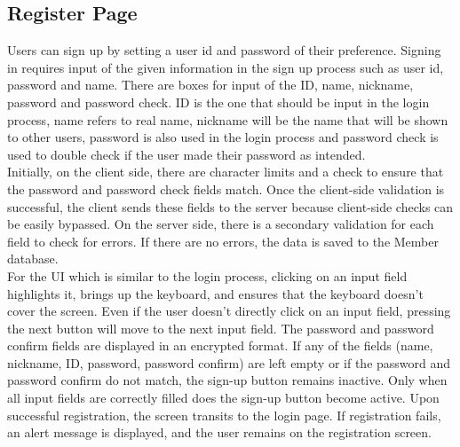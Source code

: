 \documentclass[conference]{IEEEtran}
\begin{document}
    \subsection{Register Page}
        Users can sign up by setting a user id and password of their preference. Signing in requires input  of the given information in the sign up process such as user id, password and name. There are boxes for input of the ID, name, nickname, password and password check. ID is the one that should be input in the login process, name refers to real name, nickname will be the name that will be shown to other users, password is also used in the login process and password check is used to double check if the user made their password as intended.\\
        Initially, on the client side, there are character limits and a check to ensure that the password and password check fields match. Once the client-side validation is successful, the client sends these fields to the server because client-side checks can be easily bypassed. On the server side, there is a secondary validation for each field to check for errors. If there are no errors, the data is saved to the Member database.  \\
        For the UI which is similar to the login process, clicking on an input field highlights it, brings up the keyboard, and ensures that the keyboard doesn't cover the screen. Even if the user doesn't directly click on an input field, pressing the next button will move to the next input field. The password and password confirm fields are displayed in an encrypted format. If any of the fields (name, nickname, ID, password, password confirm) are left empty or if the password and password confirm do not match, the sign-up button remains inactive. Only when all input fields are correctly filled does the sign-up button become active. Upon successful registration, the screen transits to the login page. If registration fails, an alert message is displayed, and the user remains on the registration screen.
\end{document}

